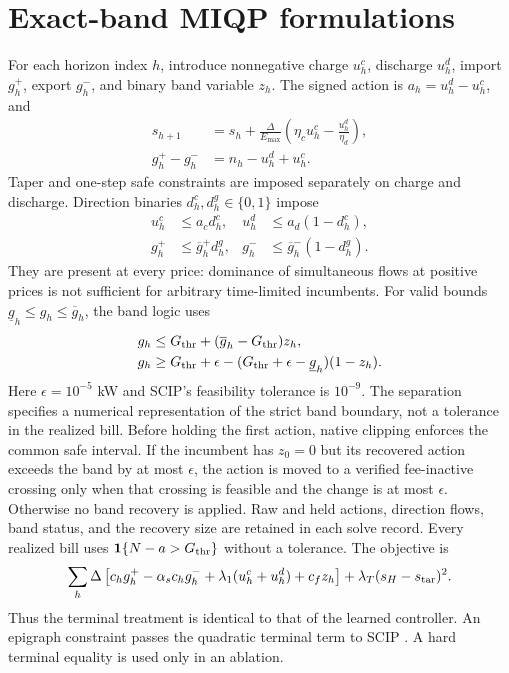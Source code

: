 \documentclass[preprint,11pt]{elsarticle}
\begin{document}


\section{Exact-band MIQP formulations}

For each horizon index $h$, introduce nonnegative charge $u_h^c$, discharge
$u_h^d$, import $g_h^+$, export $g_h^-$, and binary band variable $z_h$. The
signed action is $a_h=u_h^d-u_h^c$, and
\begin{align}
 s_{h+1}&=s_h+\frac{\Delta}{E_{\max}}
 \left(\eta_cu_h^c-\frac{u_h^d}{\eta_d}\right),\\
 g_h^+-g_h^-&=n_h-u_h^d+u_h^c.
\end{align}
Taper and one-step safe constraints are imposed separately on charge and
discharge. Direction binaries $d_h^c,d_h^g\in\{0,1\}$ impose
\begin{align}
u_h^c&\leq a_c d_h^c,& u_h^d&\leq a_d(1-d_h^c),\\
g_h^+&\leq\overline g_h^+d_h^g,&
g_h^-&\leq\overline g_h^-(1-d_h^g).
\end{align}
They are present at every price: dominance of simultaneous flows at positive
prices is not sufficient for arbitrary time-limited incumbents.
For valid bounds $\underline g_h\leq g_h\leq\overline g_h$, the
band logic uses
\begin{align}
 g_h&\leq G_{\rm thr}+(\overline g_h-G_{\rm thr})z_h,\\
 g_h&\geq G_{\rm thr}+\epsilon
 -(G_{\rm thr}+\epsilon-\underline g_h)(1-z_h).
\end{align}
Here $\epsilon=10^{-5}$ kW and SCIP's feasibility tolerance is $10^{-9}$.
The separation specifies a numerical representation of the strict band
boundary, not a tolerance in the realized bill. Before holding the first
action, native clipping enforces the common safe interval. If the incumbent
has $z_0=0$ but its recovered action exceeds the band by at most $\epsilon$,
the action is moved to a verified fee-inactive crossing only when that
crossing is feasible and the change is at most $\epsilon$. Otherwise no band
recovery is applied. Raw and held actions, direction flows, band status, and
the recovery size are retained in each solve record. Every realized bill uses
$\mathbf{1}\{N-a>G_{\rm thr}\}$ without a tolerance.
The objective is
\begin{equation}
 \sum_h\Delta\left[c_hg_h^+-\alpha_sc_hg_h^-
 +\lambda_1(u_h^c+u_h^d)+c_fz_h\right]
 +\lambda_T(s_H-s_{\rm tar})^2.
\end{equation}
Thus the terminal treatment is identical to that of the learned controller.
An epigraph constraint passes the quadratic terminal term to SCIP
\citep{Achterberg2009}. A hard terminal equality is used only in an ablation.
\end{document}
